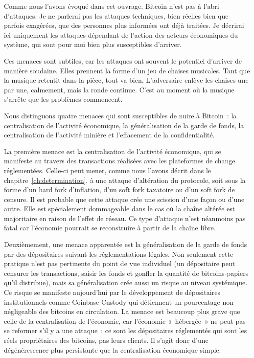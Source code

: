Comme nous l'avons évoqué dans cet ouvrage, Bitcoin n'est pas à l'abri d'attaques. Je ne parlerai pas les attaques techniques, bien réelles bien que parfois exagérées, que des personnes plus informées ont déjà traitées. Je décrirai ici uniquement les attaques dépendant de l'action des acteurs économiques du système, qui sont pour moi bien plus susceptibles d'arriver.

Ces menaces sont subtiles, car les attaques ont souvent le potentiel d'arriver de manière soudaine. Elles prennent la forme d'un jeu de chaises musicales. Tant que la musique retentit dans la pièce, tout va bien. L'adversaire enlève les chaises une par une, calmement, mais la ronde continue. C'est au moment où la musique s'arrête que les problèmes commencent.

Nous distinguons quatre menaces qui sont susceptibles de nuire à Bitcoin~: la centralisation de l'activité économique, la généralisation de la garde de fonds, la centralisation de l'activité minière et l'effacement de la confidentialité.

La première menace est la centralisation de l'activité économique, qui se manifeste au travers des transactions réalisées avec les plateformes de change réglementées. Celle-ci peut mener, comme nous l'avons décrit dans le chapitre~\ref{ch:determination}, à une attaque d'altération du protocole, soit sous la forme d'un hard fork d'inflation, d'un soft fork taxatoire ou d'un soft fork de censure. Il est probable que cette attaque crée une scission d'une façon ou d'une autre. Elle est spécialement dommageable dans le cas où la chaîne altérée est majoritaire en raison de l'effet de réseau. Ce type d'attaque n'est néanmoins pas fatal car l'économie pourrait se reconstruire à partir de la chaîne libre.

Deuxièmement, une menace apparentée est la généralisation de la garde de fonds par des dépositaires suivant les réglementations légales. Non seulement cette pratique n'est pas pertinente du point de vue individuel (un dépositaire peut censurer les transactions, saisir les fonds et gonfler la quantité de bitcoins-papiers qu'il distribue), mais sa généralisation crée aussi un risque au niveau systémique. Ce risque se manifeste aujourd'hui par le développement de dépositaires institutionnels comme Coinbase Custody qui détiennent un pourcentage non négligeable des bitcoins en circulation. La menace est beaucoup plus grave que celle de la centralisation de l'économie, car l'économie «~hébergée~» ne peut pas se reformer s'il y a une attaque~: ce sont les dépositaires réglementés qui sont les réels propriétaires des bitcoins, pas leurs clients. Il s'agit donc d'une dégénérescence plus persistante que la centralisation économique simple.


